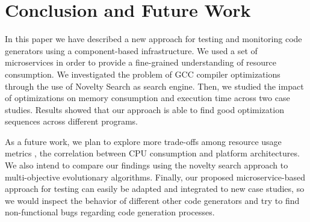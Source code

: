 \section{Conclusion and Future Work}

In this paper we have described a new approach for testing and monitoring code generators using a component-based infrastructure. 
We used a set of microservices in order to provide a fine-grained understanding of resource consumption. 
We investigated the problem of GCC compiler optimizations through the use of Novelty Search as search engine. 
Then, we studied the impact of optimizations on memory consumption and execution time across two case studies. 
Results showed that our approach is able to find good optimization sequences across different programs.

As a future work, we plan to explore more trade-offs among resource usage metrics \eg, the correlation between CPU consumption and platform architectures. 
We also intend to compare our findings using the novelty search approach to multi-objective evolutionary algorithms. 
Finally, our proposed microservice-based approach for testing can easily be adapted and integrated to new case studies, so we would inspect the behavior of different other code generators and try to find non-functional bugs regarding code generation processes.

